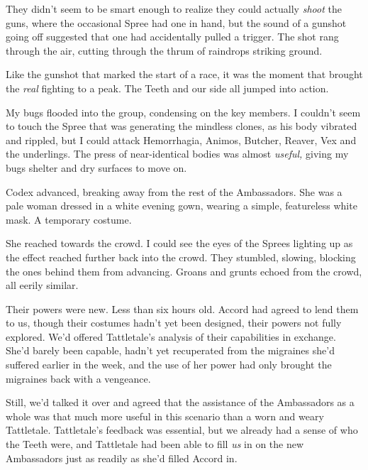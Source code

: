 They didn't seem to be smart enough to realize they could actually \emph{shoot }the guns, where the occasional Spree had one in hand, but the sound of a gunshot going off suggested that one had accidentally pulled a trigger.  The shot rang through the air, cutting through the thrum of raindrops striking ground.



Like the gunshot that marked the start of a race, it was the moment that brought the \emph{real} fighting to a peak.  The Teeth and our side all jumped into action.



My bugs flooded into the group, condensing on the key members.  I couldn't seem to touch the Spree that was generating the mindless clones, as his body vibrated and rippled, but I could attack Hemorrhagia, Animos, Butcher, Reaver, Vex and the underlings.  The press of near-identical bodies was almost \emph{useful, }giving my bugs shelter and dry surfaces to move on.



Codex advanced, breaking away from the rest of the Ambassadors.  She was a pale woman dressed in a white evening gown, wearing a simple, featureless white mask.  A temporary costume.



She reached towards the crowd.  I could see the eyes of the Sprees lighting up as the effect reached further back into the crowd.  They stumbled, slowing, blocking the ones behind them from advancing.  Groans and grunts echoed from the crowd, all eerily similar.



Their powers were new.  Less than six hours old.  Accord had agreed to lend them to us, though their costumes hadn't yet been designed, their powers not fully explored.  We'd offered Tattletale's analysis of their capabilities in exchange.  She'd barely been capable, hadn't yet recuperated from the migraines she'd suffered earlier in the week, and the use of her power had only brought the migraines back with a vengeance.



Still, we'd talked it over and agreed that the assistance of the Ambassadors as a whole was that much more useful in this scenario than a worn and weary Tattletale.  Tattletale's feedback was essential, but we already had a sense of who the Teeth were, and Tattletale had been able to fill \emph{us} in on the new Ambassadors just as readily as she'd filled Accord in.



